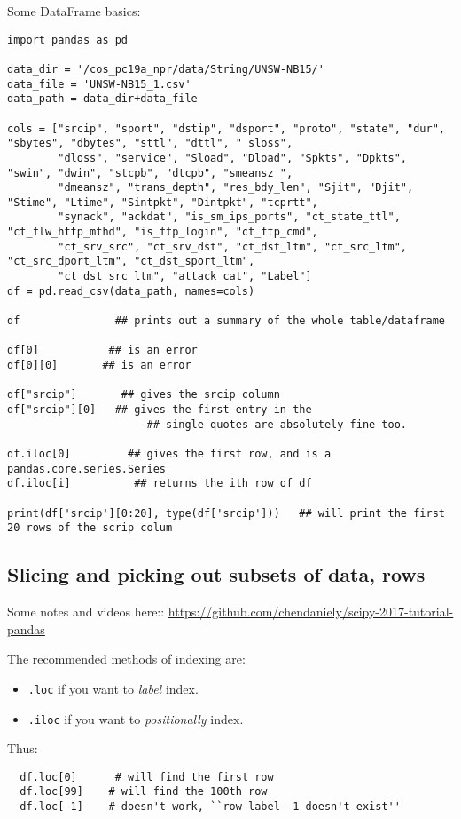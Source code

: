 \documentclass[11pt,a4paper]{article}
\begin{document}
\smallskip
\smallskip
\noindent 
Some DataFrame basics:
\begin{lstlisting}
import pandas as pd

data_dir = '/cos_pc19a_npr/data/String/UNSW-NB15/'
data_file = 'UNSW-NB15_1.csv'
data_path = data_dir+data_file

cols = ["srcip", "sport", "dstip", "dsport", "proto", "state", "dur", "sbytes", "dbytes", "sttl", "dttl", " sloss", 
        "dloss", "service", "Sload", "Dload", "Spkts", "Dpkts", "swin", "dwin", "stcpb", "dtcpb", "smeansz ", 
        "dmeansz", "trans_depth", "res_bdy_len", "Sjit", "Djit", "Stime", "Ltime", "Sintpkt", "Dintpkt", "tcprtt", 
        "synack", "ackdat", "is_sm_ips_ports", "ct_state_ttl", "ct_flw_http_mthd", "is_ftp_login", "ct_ftp_cmd",
        "ct_srv_src", "ct_srv_dst", "ct_dst_ltm", "ct_src_ltm", "ct_src_dport_ltm", "ct_dst_sport_ltm", 
        "ct_dst_src_ltm", "attack_cat", "Label"]
df = pd.read_csv(data_path, names=cols)

df               ## prints out a summary of the whole table/dataframe

df[0]           ## is an error
df[0][0]       ## is an error

df["srcip"]       ## gives the srcip column
df["srcip"][0]   ## gives the first entry in the  
                      ## single quotes are absolutely fine too. 

df.iloc[0]         ## gives the first row, and is a pandas.core.series.Series
df.iloc[i]          ## returns the ith row of df

print(df['srcip'][0:20], type(df['srcip']))   ## will print the first 20 rows of the scrip colum
\end{lstlisting}




\newpage
\subsection{Slicing and picking out subsets of data, rows}

Some notes and videos here::
\href{https://github.com/chendaniely/scipy-2017-tutorial-pandas}{https://github.com/chendaniely/scipy-2017-tutorial-pandas}

\noindent
The recommended methods of indexing are:
\begin{itemize}
\item{{\tt .loc} if you want to {\it label} index.}
\item{{\tt .iloc} if you want to {\it positionally} index.}
\end{itemize}
Thus:
\begin{lstlisting}
  df.loc[0]      # will find the first row
  df.loc[99]    # will find the 100th row
  df.loc[-1]    # doesn't work, ``row label -1 doesn't exist''
\end{lstlisting}
\end{document}
